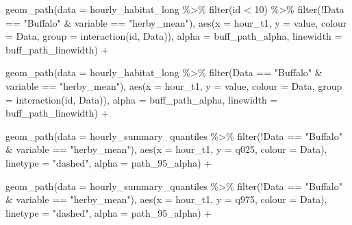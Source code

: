\documentclass[
  letterpaper,
  DIV=11,
  numbers=noendperiod]{scrartcl}
\newenvironment{Shaded}{\begin{snugshade}}{\end{snugshade}}
\newcommand{\AttributeTok}[1]{\textcolor[rgb]{0.40,0.45,0.13}{#1}}
\newcommand{\DecValTok}[1]{\textcolor[rgb]{0.68,0.00,0.00}{#1}}
\newcommand{\FunctionTok}[1]{\textcolor[rgb]{0.28,0.35,0.67}{#1}}
\newcommand{\NormalTok}[1]{\textcolor[rgb]{0.00,0.23,0.31}{#1}}
\newcommand{\SpecialCharTok}[1]{\textcolor[rgb]{0.37,0.37,0.37}{#1}}
\newcommand{\StringTok}[1]{\textcolor[rgb]{0.13,0.47,0.30}{#1}}
\begin{document}
\begin{Shaded}
\begin{Highlighting}[]
  \FunctionTok{geom\_path}\NormalTok{(}\AttributeTok{data =}\NormalTok{ hourly\_habitat\_long }\SpecialCharTok{\%\textgreater{}\%} \FunctionTok{filter}\NormalTok{(id }\SpecialCharTok{\textless{}} \DecValTok{10}\NormalTok{) }\SpecialCharTok{\%\textgreater{}\%} 
              \FunctionTok{filter}\NormalTok{(}\SpecialCharTok{!}\NormalTok{Data }\SpecialCharTok{==} \StringTok{"Buffalo"} \SpecialCharTok{\&}\NormalTok{ variable }\SpecialCharTok{==} \StringTok{"herby\_mean"}\NormalTok{),}
                 \FunctionTok{aes}\NormalTok{(}\AttributeTok{x =}\NormalTok{ hour\_t1, }\AttributeTok{y =}\NormalTok{ value, }\AttributeTok{colour =}\NormalTok{ Data, }\AttributeTok{group =} \FunctionTok{interaction}\NormalTok{(id, Data)),}
                 \AttributeTok{alpha =}\NormalTok{ buff\_path\_alpha,}
              \AttributeTok{linewidth =}\NormalTok{ buff\_path\_linewidth) }\SpecialCharTok{+}
  
  \FunctionTok{geom\_path}\NormalTok{(}\AttributeTok{data =}\NormalTok{ hourly\_habitat\_long }\SpecialCharTok{\%\textgreater{}\%} 
              \FunctionTok{filter}\NormalTok{(Data }\SpecialCharTok{==} \StringTok{"Buffalo"} \SpecialCharTok{\&}\NormalTok{ variable }\SpecialCharTok{==} \StringTok{"herby\_mean"}\NormalTok{), }
                 \FunctionTok{aes}\NormalTok{(}\AttributeTok{x =}\NormalTok{ hour\_t1, }\AttributeTok{y =}\NormalTok{ value, }\AttributeTok{colour =}\NormalTok{ Data, }\AttributeTok{group =} \FunctionTok{interaction}\NormalTok{(id, Data)), }
                 \AttributeTok{alpha =}\NormalTok{ buff\_path\_alpha,}
              \AttributeTok{linewidth =}\NormalTok{ buff\_path\_linewidth) }\SpecialCharTok{+}

  \FunctionTok{geom\_path}\NormalTok{(}\AttributeTok{data =}\NormalTok{ hourly\_summary\_quantiles }\SpecialCharTok{\%\textgreater{}\%} 
              \FunctionTok{filter}\NormalTok{(}\SpecialCharTok{!}\NormalTok{Data }\SpecialCharTok{==} \StringTok{"Buffalo"} \SpecialCharTok{\&}\NormalTok{ variable }\SpecialCharTok{==} \StringTok{"herby\_mean"}\NormalTok{),}
              \FunctionTok{aes}\NormalTok{(}\AttributeTok{x =}\NormalTok{ hour\_t1, }\AttributeTok{y =}\NormalTok{ q025, }\AttributeTok{colour =}\NormalTok{ Data),}
            \AttributeTok{linetype =} \StringTok{"dashed"}\NormalTok{,}
              \AttributeTok{alpha =}\NormalTok{ path\_95\_alpha) }\SpecialCharTok{+}

  \FunctionTok{geom\_path}\NormalTok{(}\AttributeTok{data =}\NormalTok{ hourly\_summary\_quantiles }\SpecialCharTok{\%\textgreater{}\%} 
              \FunctionTok{filter}\NormalTok{(}\SpecialCharTok{!}\NormalTok{Data }\SpecialCharTok{==} \StringTok{"Buffalo"} \SpecialCharTok{\&}\NormalTok{ variable }\SpecialCharTok{==} \StringTok{"herby\_mean"}\NormalTok{),}
              \FunctionTok{aes}\NormalTok{(}\AttributeTok{x =}\NormalTok{ hour\_t1, }\AttributeTok{y =}\NormalTok{ q975, }\AttributeTok{colour =}\NormalTok{ Data),}
            \AttributeTok{linetype =} \StringTok{"dashed"}\NormalTok{,}
              \AttributeTok{alpha =}\NormalTok{ path\_95\_alpha) }\SpecialCharTok{+}
  

\end{Highlighting}
\end{Shaded}
\end{document}
